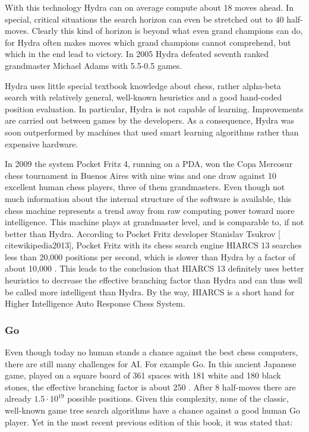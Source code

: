 \documentclass[10pt]{book}
\begin{document}
With this technology Hydra can on average compute about 18 moves ahead. In special, critical situations the search horizon can even be stretched out to 40 half-moves. Clearly this kind of horizon is beyond what even grand champions can do, for Hydra often makes moves which grand champions cannot comprehend, but which in the end lead to victory. In 2005 Hydra defeated seventh ranked grandmaster Michael Adams with 5.5-0.5 games.

Hydra uses little special textbook knowledge about chess, rather alpha-beta search with relatively general, well-known heuristics and a good hand-coded\\
position evaluation. In particular, Hydra is not capable of learning. Improvements are carried out between games by the developers. As a consequence, Hydra was soon outperformed by machines that used smart learning algorithms rather than expensive hardware.


In 2009 the system Pocket Fritz 4, running on a PDA, won the Copa Mercosur chess tournament in Buenos Aires with nine wins and one draw against 10 excellent human chess players, three of them grandmasters. Even though not much information about the internal structure of the software is available, this chess machine represents a trend away from raw computing power toward more intelligence. This machine plays at grandmaster level, and is comparable to, if not better than Hydra. According to Pocket Fritz developer Stanislav Tsukrov [\\cite{wikipedia2013}], Pocket Fritz with its chess search engine HIARCS 13 searches less than 20,000 positions per second, which is slower than Hydra by a factor of about 10,000 . This leads to the conclusion that HIARCS 13 definitely uses better heuristics to decrease the effective branching factor than Hydra and can thus well be called more intelligent than Hydra. By the way, HIARCS is a short hand for Higher Intelligence Auto Response Chess System.

\subsubsection*{Go}
Even though today no human stands a chance against the best chess computers, there are still many challenges for AI. For example Go. In this ancient Japanese game, played on a square board of 361 spaces with 181 white and 180 black stones, the effective branching factor is about 250 . After 8 half-moves there are already $1.5 \cdot 10^{19}$ possible positions. Given this complexity, none of the classic, well-known game tree search algorithms have a chance against a good human Go player. Yet in the most recent previous edition of this book, it was stated that:
\end{document}

